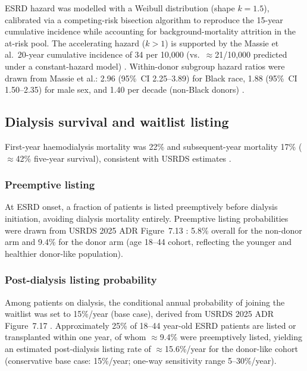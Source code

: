 ESRD hazard was modelled with a Weibull distribution (shape $k = 1.5$),
calibrated via a competing-risk bisection algorithm to reproduce the
15-year cumulative incidence while accounting for background-mortality
attrition in the at-risk pool.
The accelerating hazard ($k > 1$) is supported by the Massie et al.\ 20-year
cumulative incidence of 34 per 10,000 (vs.\ $\approx$21/10,000 predicted
under a constant-hazard model) \cite{massie_quantifying_2017}.
Within-donor subgroup hazard ratios were drawn from Massie et al.:
2.96 (95\%~CI 2.25--3.89) for Black race, 1.88 (95\%~CI 1.50--2.35) for
male sex, and 1.40 per decade (non-Black donors) \cite{massie_quantifying_2017}.

\subsection{Dialysis survival and waitlist listing}

First-year haemodialysis mortality was 22\% and subsequent-year mortality 17\%
($\approx$42\% five-year survival), consistent with USRDS estimates
\cite{usrds_2024}.

\subsubsection*{Preemptive listing}

At ESRD onset, a fraction of patients is listed preemptively before dialysis
initiation, avoiding dialysis mortality entirely.
Preemptive listing probabilities were drawn from USRDS 2025 ADR Figure~7.13
\cite{usrds_2025}: 5.8\% overall for the non-donor arm and 9.4\% for the donor
arm (age 18--44 cohort, reflecting the younger and healthier donor-like
population).

\subsubsection*{Post-dialysis listing probability}

Among patients on dialysis, the conditional annual probability of joining the
waitlist was set to 15\%/year (base case), derived from USRDS 2025 ADR
Figure~7.17 \cite{usrds_2025}.
Approximately 25\% of 18--44 year-old ESRD patients are listed or transplanted
within one year, of whom $\approx$9.4\% were preemptively listed, yielding an
estimated post-dialysis listing rate of $\approx$15.6\%/year for the
donor-like cohort (conservative base case: 15\%/year; one-way sensitivity range
5--30\%/year).

